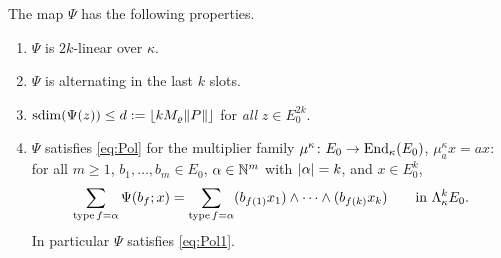 \begin{lemma}\label{lem:Psi}
The map $\Psi$ has the following properties.
\begin{enumerate}
\item[($\Psi$1)] $\Psi$ is $2k$\nobreakdash-linear over $\kappa$.
\item[($\Psi$2)] $\Psi$ is alternating in the last $k$ slots.
\item[($\Psi$3)] $\operatorname{sdim}(\Psi(z))\le d:=\lfloor kM_\varrho\lVert P\rVert\rfloor$ for \emph{all} $z\in E_0^{2k}$.
\item[($\Psi$4)] $\Psi$ satisfies \eqref{eq:Pol} for the multiplier family $\mu^\kappa\colon E_0\to\operatorname{End}_\kappa(E_0)$,
$\mu^\kappa_ax=ax$: for all $m\ge1$, $b_1,\dots,b_m\in E_0$, $\alpha\in\mathbb N^m$ with $\lvert \alpha\rvert=k$, and $x\in E_0^k$,
\[
\sum_{\operatorname{type} f=\alpha}\Psi(b_f;x)=\sum_{\operatorname{type} f=\alpha}(b_{f(1)}x_1)\wedge\dots\wedge(b_{f(k)}x_k)\qquad\text{in }\Lambda^k_\kappa E_0 .
\]
In particular $\Psi$ satisfies \eqref{eq:Pol1}.
\end{enumerate}
\end{lemma}

